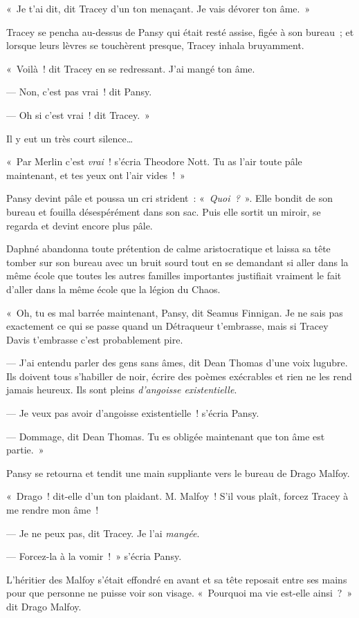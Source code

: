 «~Je t'ai dit, dit Tracey d'un ton menaçant. Je vais dévorer ton âme.~»

Tracey se pencha au-dessus de Pansy qui était resté assise, figée à son bureau~; et lorsque leurs lèvres se touchèrent presque, Tracey inhala bruyamment.

«~Voilà~! dit Tracey en se redressant. J'ai mangé ton âme.

--- Non, c'est pas vrai~! dit Pansy.

--- Oh si c'est vrai~! dit Tracey.~»

Il y eut un très court silence…

«~Par Merlin c'est \emph{vrai}~! s'écria Theodore Nott. Tu as l'air toute pâle maintenant, et tes yeux ont l'air vides~!~»

Pansy devint pâle et poussa un cri strident~: «~\emph{Quoi~?}~». Elle bondit de son bureau et fouilla désespérément dans son sac. Puis elle sortit un miroir, se regarda et devint encore plus pâle.

Daphné abandonna toute prétention de calme aristocratique et laissa sa tête tomber sur son bureau avec un bruit sourd tout en se demandant si aller dans la même école que toutes les autres familles importantes justifiait vraiment le fait d'aller dans la même école que la légion du Chaos.

«~Oh, tu es mal barrée maintenant, Pansy, dit Seamus Finnigan. Je ne sais pas exactement ce qui se passe quand un Détraqueur t'embrasse, mais si Tracey Davis t'embrasse c'est probablement pire.

--- J'ai entendu parler des gens sans âmes, dit Dean Thomas d'une voix lugubre. Ils doivent tous s'habiller de noir, écrire des poèmes exécrables et rien ne les rend jamais heureux. Ils sont pleins \emph{d'angoisse existentielle}.

--- Je veux pas avoir d'angoisse existentielle~! s'écria Pansy.

--- Dommage, dit Dean Thomas. Tu es obligée maintenant que ton âme est partie.~»

Pansy se retourna et tendit une main suppliante vers le bureau de Drago Malfoy.

«~Drago~! dit-elle d'un ton plaidant. M. Malfoy~! S'il vous plaît, forcez Tracey à me rendre mon âme~!

--- Je ne peux pas, dit Tracey. Je l'ai \emph{mangée}.

--- Forcez-la à la vomir~!~» s'écria Pansy.

L'héritier des Malfoy s'était effondré en avant et sa tête reposait entre ses mains pour que personne ne puisse voir son visage. «~Pourquoi ma vie est-elle ainsi~?~» dit Drago Malfoy.

